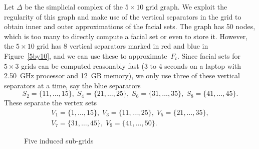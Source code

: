\documentclass[aos,noinfoline]{imsart}
\def\i{\underline i}
\theoremstyle{remark}
\theoremstyle{definition}
\newcommand{\griddefinenodes}[2]{%
  \foreach \j in {1,...,#2} \foreach \i in {1,...,#1} {
    \path (\j,-\i) coordinate (X\i\j);}}
\newcommand{\griddrawedges}[2]{%
  \foreach \i in {1,...,#1} \foreach \j [count=\jj] in {2,...,#2} { \draw (X\i\jj) -- (X\i\j);}
  \foreach \j in {1,...,#2} \foreach \i [count=\ii] in {2,...,#1} { \draw (X\ii\j) -- (X\i\j);}}
\newcommand{\griddrawnodes}[2]{%
  \foreach \j in {1,...,#2} \foreach \i in {1,...,#1} {
    \filldraw[fill=green!50!black] (X\i\j) circle (3pt); }}
\newcommand{\gridaddlabels}[3][1]{%
  \foreach \j in {1,...,#3} {
    \node[label=above:{\pgfmathparse{#2*(\j-1)+#1}\pgfmathprintnumber{\pgfmathresult}}] at (X1\j) {};
    \node[label=below:{\pgfmathparse{#2*\j-1+#1}\pgfmathprintnumber{\pgfmathresult}}] at (X#2\j) {}; }}
\newcommand{\grid}[2]{%
  \griddefinenodes{#1}{#2}
  \griddrawedges{#1}{#2}
  \griddrawnodes{#1}{#2}}
\newcommand{\labelledgrid}[3][1]{%
  \grid{#2}{#3}
  \gridaddlabels[#1]{#2}{#3}}
\begin{document}
Let $\Delta$ be the simplicial complex of the $5\times 10$ grid graph.  We exploit the regularity of this
graph and make use of the vertical separators in the grid to obtain inner and outer approximations of the facial
sets.  The graph has 50 nodes, which is too many to directly compute a facial set or even to store it.  However, the
$5\times10$ grid has 8 vertical separators marked in red and blue in Figure~\ref{5by10}, and we can use these to
approximate~$F_t$.  Since facial sets for $5\times 3$ grids can be computed reasonably fast (3 to 4 seconds on a laptop
with \SI{2.50}{GHz} processor %
and \SI{12}{GB} memory), we only use three of these vertical separators at a time, say the blue separators
\begin{equation*}
  S_{2}=\{11,\dots,15\},\;S_{4}=\{21,\dots,25\},\;S_{6}=\{31,\dots,35\},\;S_{8}=\{41,\dots,45\}.
\end{equation*}
These  separate the vertex sets
\begin{gather*}
  V_{1}=\{1,\dots,15\},\; V_{3}=\{11,\dots,25\},\; V_{5}=\{21,\dots,35\},\\
  V_{7}=\{31,\dots,45\},\; V_{9}=\{41,\dots,50\}.
\end{gather*}

\begin{figure} %
  \centering

  \caption{Five induced sub-grids}
  \label{fig:local5}
\end{figure}
\end{document}
